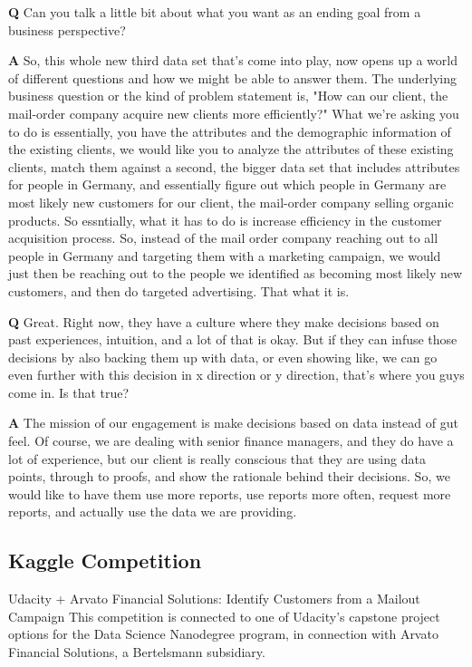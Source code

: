 \textbf{Q} Can you talk a little bit about what you want as an ending
goal from a business perspective?

\textbf{A} So, this whole new third data set that's come into play, now
opens up a world of different questions and how we might be able to
answer them. The underlying business question or the kind of problem
statement is, "How can our client, the mail-order company acquire new
clients more efficiently?" What we're asking you to do is essentially,
you have the attributes and the demographic information of the existing
clients, we would like you to analyze the attributes of these existing
clients, match them against a second, the bigger data set that includes
attributes for people in Germany, and essentially figure out which
people in Germany are most likely new customers for our client, the
mail-order company selling organic products. So essntially, what it has
to do is increase efficiency in the customer acquisition process. So,
instead of the mail order company reaching out to all people in Germany
and targeting them with a marketing campaign, we would just then be
reaching out to the people we identified as becoming most likely new
customers, and then do targeted advertising. That what it is.

\textbf{Q} Great. Right now, they have a culture where they make
decisions based on past experiences, intuition, and a lot of that is
okay. But if they can infuse those decisions by also backing them up
with data, or even showing like, we can go even further with this
decision in x direction or y direction, that's where you guys come in.
Is that true?

\textbf{A} The mission of our engagement is make decisions based on data
instead of gut feel. Of course, we are dealing with senior finance
managers, and they do have a lot of experience, but our client is really
conscious that they are using data points, through to proofs, and show
the rationale behind their decisions. So, we would like to have them use
more reports, use reports more often, request more reports, and actually
use the data we are providing.

\hypertarget{kaggle-competition}{%
\subsection{Kaggle Competition}\label{kaggle-competition}}

Udacity + Arvato Financial Solutions: Identify Customers from a Mailout
Campaign This competition is connected to one of Udacity's capstone
project options for the Data Science Nanodegree program, in connection
with Arvato Financial Solutions, a Bertelsmann subsidiary.

